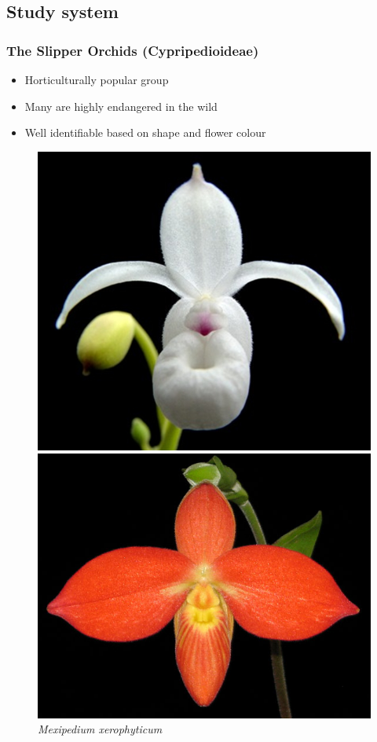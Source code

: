 \documentclass[]{beamer}
\begin{document}
	\subsection{Study system}
    \begin{frame}
        \frametitle{The Slipper Orchids (Cypripedioideae)}
        \begin{itemize}
            \item Horticulturally popular group
            \item Many are highly endangered in the wild
            \item Well identifiable based on shape and flower colour
        \end{itemize}

        \begin{figure}[!htb]
              \includegraphics[width=\linewidth]{Mexipedium_xerophyticum}
              \caption*{\textit{Mexipedium xerophyticum}}
            \endminipage\hfill
              \includegraphics[width=\linewidth]{Phragmipedium_besseae}

\end{figure}
\end{frame}
\end{document}

